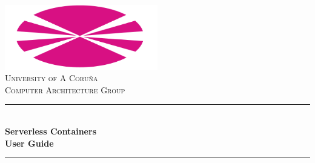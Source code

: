\documentclass[12pt]{article}
\begin{document}
	
	\begin{titlepage}
		
		\newcommand{\HRule}{\rule{\linewidth}{0.5mm}} %
		
		\center %
		
		
		\includegraphics[width=0.5\textwidth]{udc_logo.png}\\[1cm]
		
		\textsc{\LARGE University of A Coruña}\\[1.5cm] %
		\textsc{\Large Computer Architecture Group}\\[0.5cm] %
		
		
		\HRule \\[0.4cm]
		{\huge \bfseries Serverless Containers}\\[0.3cm] %
		{\Large \bfseries User Guide}
		\HRule \\[1.5cm]
		
		
		

\end{titlepage}
\end{document}
